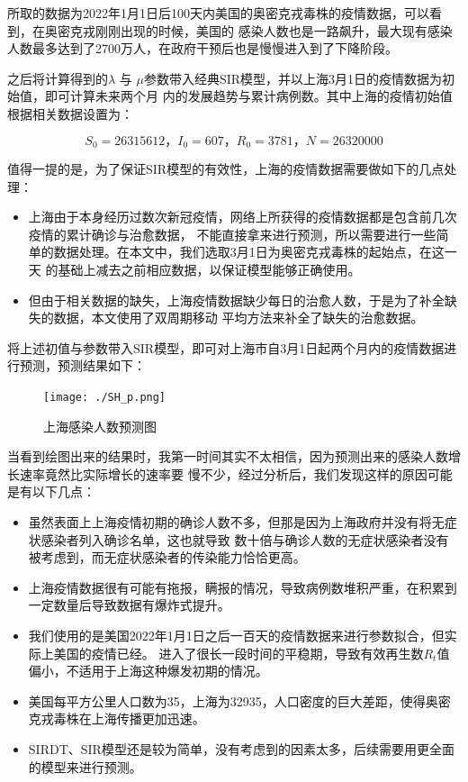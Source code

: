 \documentclass[bwprint]{gmcmthesis}
\numberwithin{figure}{section}
\begin{document}
\par 所取的数据为2022年1月1日后100天内美国的奥密克戎毒株的疫情数据，可以看到，在奥密克戎刚刚出现的时候，美国的
感染人数也是一路飙升，最大现有感染人数最多达到了2700万人，在政府干预后也是慢慢进入到了下降阶段。
\par 之后将计算得到的$\lambda$ 与 $\mu$参数带入经典SIR模型，并以上海3月1日的疫情数据为初始值，即可计算未来两个月
内的发展趋势与累计病例数。其中上海的疫情初始值根据相关数据设置为：

\begin{equation}
    S_0=26315612\text{，}I_0=607\text{，}R_0=3781\text{，}N=26320000
\end{equation}


\par 值得一提的是，为了保证SIR模型的有效性，上海的疫情数据需要做如下的几点处理：
\begin{itemize}
    \item 上海由于本身经历过数次新冠疫情，网络上所获得的疫情数据都是包含前几次疫情的累计确诊与治愈数据，
不能直接拿来进行预测，所以需要进行一些简单的数据处理。在本文中，我们选取3月1日为奥密克戎毒株的起始点，在这一天
的基础上减去之前相应数据，以保证模型能够正确使用。
    \item 但由于相关数据的缺失，上海疫情数据缺少每日的治愈人数，于是为了补全缺失的数据，本文使用了双周期移动
平均方法来补全了缺失的治愈数据。
\end{itemize}


\par 将上述初值与参数带入SIR模型，即可对上海市自3月1日起两个月内的疫情数据进行预测，预测结果如下：

\begin{figure}[!h]
    \centering
    \texttt{[image: ./SH\_p.png]}
    \caption{上海感染人数预测图}
    \label{fig1}
\end{figure}

\par 当看到绘图出来的结果时，我第一时间其实不太相信，因为预测出来的感染人数增长速率竟然比实际增长的速率要
慢不少，经过分析后，我们发现这样的原因可能是有以下几点：
\begin{itemize}
    \item 虽然表面上上海疫情初期的确诊人数不多，但那是因为上海政府并没有将无症状感染者列入确诊名单，这也就导致
数十倍与确诊人数的无症状感染者没有被考虑到，而无症状感染者的传染能力恰恰更高。
    \item 上海疫情数据很有可能有拖报，瞒报的情况，导致病例数堆积严重，在积累到一定数量后导致数据有爆炸式提升。
    \item 我们使用的是美国2022年1月1日之后一百天的疫情数据来进行参数拟合，但实际上美国的疫情已经。
进入了很长一段时间的平稳期，导致有效再生数$R_t$值偏小，不适用于上海这种爆发初期的情况。
    \item 美国每平方公里人口数为35，上海为32935，人口密度的巨大差距，使得奥密克戎毒株在上海传播更加迅速。
    \item SIRDT、SIR模型还是较为简单，没有考虑到的因素太多，后续需要用更全面的模型来进行预测。
\end{itemize}
\end{document}
